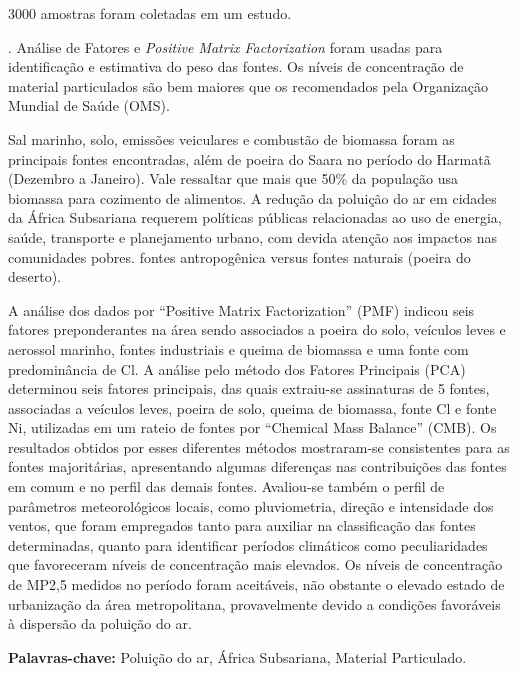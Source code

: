 3000 amostras foram coletadas em um estudo. 
\citep{zhou2011}
\citep{zhou2014chemical}


. Análise de Fatores e \textit{Positive Matrix Factorization} foram usadas para identificação e 
estimativa do peso das fontes. Os níveis de concentração de material particulados são bem maiores que os 
recomendados pela Organização Mundial de Saúde (OMS).%
 
Sal marinho, solo, emissões veiculares e combustão de biomassa foram as principais fontes encontradas, além 
de poeira do Saara no período do Harmatã (Dezembro a Janeiro). Vale ressaltar que mais que 50\% da população 
usa biomassa para cozimento de alimentos. A redução da poluição do ar em cidades da África Subsariana requerem 
políticas públicas relacionadas ao uso de energia, saúde, transporte e planejamento urbano, com devida atenção 
aos impactos nas comunidades pobres.
fontes antropogênica versus fontes naturais (poeira do deserto).



 A análise dos dados por “Positive Matrix Factorization” (PMF) indicou seis fatores preponderantes na área sendo associados a poeira do solo, veículos leves e aerossol marinho, fontes industriais e queima de biomassa e uma fonte com predominância de Cl. A análise pelo método dos Fatores Principais (PCA) determinou seis fatores principais, das quais extraiu-se assinaturas de 5 fontes, associadas a veículos leves, poeira de solo, queima de biomassa, fonte Cl e fonte Ni, utilizadas em um rateio de fontes por “Chemical Mass Balance” (CMB). Os resultados obtidos por esses diferentes métodos mostraram-se consistentes para as fontes majoritárias, apresentando algumas diferenças nas contribuições das fontes em comum e no perfil das demais fontes. Avaliou-se também o perfil de parâmetros meteorológicos locais, como pluviometria, direção e intensidade dos ventos, que foram empregados tanto para auxiliar na classificação das fontes determinadas, quanto para identificar períodos climáticos como peculiaridades que favoreceram níveis de concentração mais elevados. Os níveis de concentração de MP2,5 medidos no período foram aceitáveis, não obstante o elevado estado de urbanização da área metropolitana, provavelmente devido a condições favoráveis à dispersão da poluição do ar.



\par
\vspace{1em}
\noindent\textbf{Palavras-chave:}  Poluição do ar, África Subsariana, Material Particulado.
\newpage
